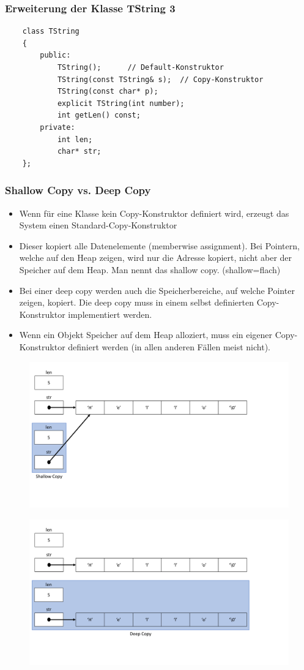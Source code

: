 \subsubsection{Erweiterung der Klasse TString 3}
\label{sec:Erweiterung der Klasse TString 3}
\noindent
\begin{minipage}{\linewidth}
	\begin{lstlisting}
	class TString
	{
		public:
			TString();		// Default-Konstruktor
			TString(const TString& s);	// Copy-Konstruktor
			TString(const char* p);
			explicit TString(int number);
			int getLen() const;
		private:
			int len;
			char* str;
	};
	\end{lstlisting}
\end{minipage}

\subsubsection{Shallow Copy vs. Deep Copy}
\label{sec:Shallow Copy vs. Deep Copy}
\begin{itemize}
	\item Wenn für eine Klasse kein Copy-Konstruktor definiert wird, erzeugt das System einen Standard-Copy-Konstruktor
	\item Dieser kopiert alle Datenelemente (memberwise assignment). Bei Pointern, welche auf den Heap zeigen, wird nur die Adresse kopiert, nicht aber der Speicher auf dem Heap. Man nennt das shallow copy. (shallow=flach)
	\item Bei einer deep copy werden auch die Speicherbereiche, auf welche Pointer zeigen, kopiert. Die deep copy muss in einem selbst definierten Copy-Konstruktor implementiert werden.
	\item[\-]\begin{hinweis}
		Wenn ein Objekt Speicher auf dem Heap alloziert, muss ein eigener Copy-Konstruktor definiert werden (in allen anderen Fällen meist nicht).
	\end{hinweis}
\end{itemize}

\noindent
\begin{figure}[hh]
	\centering
	\includegraphics[width=0.2\linewidth]{images/klasse5.pdf}
\end{figure}

\noindent
\begin{figure}[hh]
	\centering
	\includegraphics[width=0.2\linewidth]{images/klasse6.pdf}
\end{figure}


